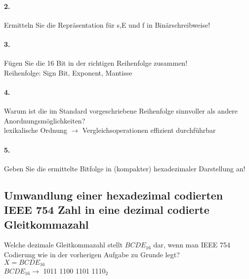 \documentclass[paper=a4, fontsize=11pt]{scrartcl}
\numberwithin{equation}{section}
\numberwithin{figure}{section}
\numberwithin{table}{section}
\begin{document}
\paragraph{2.}
Ermitteln Sie die Repräsentation für s,E und f in Binärschreibweise! \\

\paragraph{3.}
Fügen Sie die 16 Bit in der richtigen Reihenfolge zusammen! \\

Reihenfolge: Sign Bit, Exponent, Mantisse \\

\paragraph{4.}
Warum ist die im Standard vorgeschriebene Reihenfolge sinnvoller als andere Anordnungsmöglichkeiten? \\

lexikalische Ordnung $\rightarrow$ Vergleichsoperationen effizient durchführbar

\paragraph{5.}
Geben Sie die ermittelte Bitfolge in (kompakter) hexadezimaler Darstellung an! \\


\subsection{Umwandlung einer hexadezimal codierten IEEE 754 Zahl in eine dezimal codierte Gleitkommazahl}

Welche dezimale Gleitkommazahl stellt $BCDE_{16}$ dar, wenn man IEEE 754 Codierung wie in der vorherigen Aufgabe zu Grunde legt? \\

$X=BCDE_{16}$ \\
$BCDE_{16} \rightarrow$ 1011 1100 1101 111$0_{2}$ \\
\end{document}

